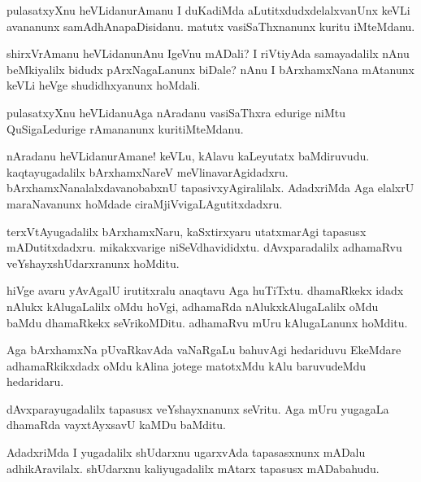 \begin{mng}
pulasatxyXnu heVLidanu\mdash rAmanu I duKadiMda aLutitxdudxdelalxvanUnx keVLi avananunx samAdhAnapaDisidanu. matutx vasiSaThxnanunx kuritu iMteMdanu.
\end{mng}

\begin{mng}
shirxVrAmanu heVLidanu\mdash nAnu IgeVnu mADali? I riVtiyAda samayadalilx nAnu beMkiyalilx bidudx pArxNagaLanunx biDale? nAnu I bArxhamxNana mAtanunx keVLi heVge shudidhxyanunx hoMdali.
\end{mng}

\begin{mng}
pulasatxyXnu heVLidanu\mdash Aga nAradanu vasiSaThxra edurige niMtu QuSigaLedurige rAmananunx kuritiMteMdanu.
\end{mng}

\begin{mng}
nAradanu heVLidanu\mdash rAmane! keVLu, kAlavu kaLeyutatx baMdiruvudu. kaqtayugadalilx bArxhamxNareV meVlinavarAgidadxru. bArxhamxNanalalxdavanobabxnU tapasivxyAgiralilalx. AdadxriMda Aga elalxrU maraNavanunx hoMdade ciraMjiVvigaLAgutitxdadxru.
\end{mng}

\begin{mng}
terxVtAyugadalilx bArxhamxNaru, kaSxtirxyaru utatxmarAgi tapasusx mADutitxdadxru. mikakxvarige niSeVdhavididxtu. dAvxparadalilx adhamaRvu veYshayxshUdarxranunx hoMditu.
\end{mng}

\begin{mng}
hiVge avaru yAvAgalU irutitxralu anaqtavu Aga huTiTxtu. dhamaRkekx idadx nAlukx kAlugaLalilx oMdu hoVgi, adhamaRda nAlukx\mdash kAlugaLalilx oMdu baMdu dhamaRkekx seVrikoMDitu. adhamaRvu mUru kAlugaLanunx hoMditu.
\end{mng}

\begin{mng}
Aga bArxhamxNa pUvaRkavAda vaNaRgaLu bahuvAgi hedariduvu EkeMdare adhamaRkikxdadx oMdu kAlina jotege matotxMdu kAlu baruvudeMdu hedaridaru.
\end{mng}

\begin{mng}
dAvxparayugadalilx tapasusx veYshayxnanunx seVritu. Aga mUru yugagaLa dhamaRda vayxtAyxsavU kaMDu baMditu.
\end{mng}

\begin{mng}
AdadxriMda I yugadalilx shUdarxnu ugarxvAda tapasasxnunx mADalu adhikAravilalx. shUdarxnu kaliyugadalilx mAtarx tapasusx mADabahudu.
\end{mng}


